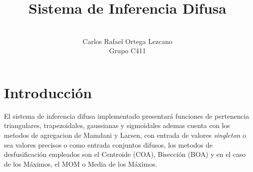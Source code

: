 \documentclass[a4paper,10pt,twocolumn]{article}
\title{Sistema de Inferencia Difusa}
\author{\\
	\name Carlos Rafael Ortega Lezcano \\ \addr Grupo C411 }
\begin{document}



\section*{Introducci\'on}\label{sec:intro}

El sistema de inferencia difusa implementado presentar\'a funciones de pertenencia triangulares, trapezoidales, gaussianas y sigmoidales ademas cuenta con los metodos de agregacion de Mamdani y Larsen, con entrada de valores \textit{singleton} o sea valores precisos o como entrada conjuntos difusos, los metodos de desfusificaci\'on empleados son el Centroide (COA), Bisecci\'on (BOA) y en el caso de los M\'aximos, el MOM o Media de los M\'aximos.
\end{document}
